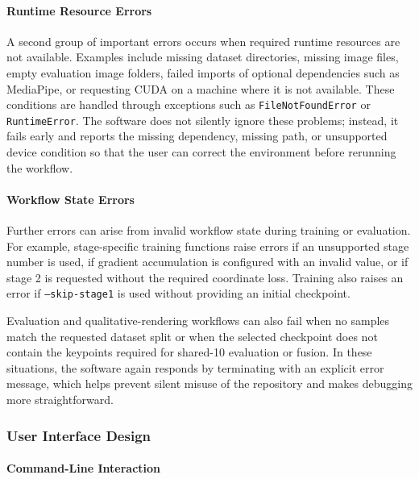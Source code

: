 ﻿\documentclass[11pt,a4paper]{article}
\begin{document}
\paragraph*{Runtime Resource Errors}

A second group of important errors occurs when required runtime resources are
not available. Examples include missing dataset directories, missing image
files, empty evaluation image folders, failed imports of optional
dependencies such as MediaPipe, or requesting CUDA on a machine where it is
not available. These conditions are handled through exceptions such as
\texttt{FileNotFoundError} or \texttt{RuntimeError}. The software does not
silently ignore these problems; instead, it fails early and reports the
missing dependency, missing path, or unsupported device condition so that the
user can correct the environment before rerunning the workflow.

\paragraph*{Workflow State Errors}

Further errors can arise from invalid workflow state during training or
evaluation. For example, stage-specific training functions raise errors if an
unsupported stage number is used, if gradient accumulation is configured with
an invalid value, or if stage 2 is requested without the required coordinate
loss. Training also raises an error if \texttt{--skip-stage1} is used without
providing an initial checkpoint.

\medskip

\noindent
Evaluation and qualitative-rendering workflows can also fail when no samples
match the requested dataset split or when the selected checkpoint does not
contain the keypoints required for shared-10 evaluation or fusion. In these
situations, the software again responds by terminating with an explicit error
message, which helps prevent silent misuse of the repository and makes
debugging more straightforward.

\subsubsection{User Interface Design}

\paragraph*{Command-Line Interaction}
\end{document}
